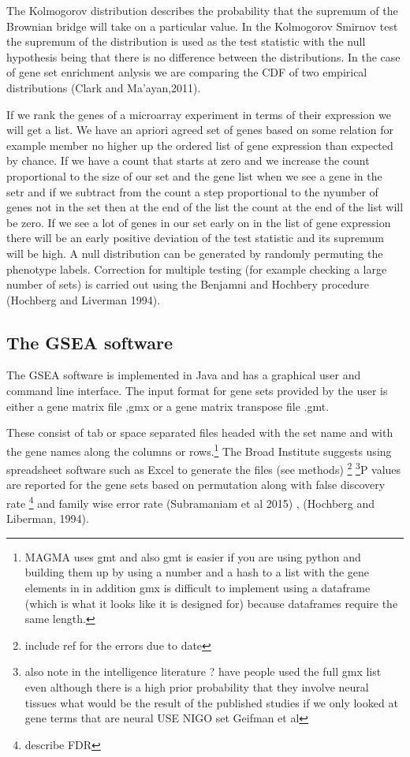 The Kolmogorov distribution describes the probability that the supremum of the Brownian bridge will take on a particular value. In the Kolmogorov Smirnov test the supremum of the distribution is used as the test statistic with the null hypothesis being that there is no difference between the distributions. In the case of gene set enrichment anlysis we are comparing the CDF of two empirical distributions (Clark and Ma'ayan,2011).

If we rank the genes of a microarray experiment in terms of their expression we will get a list. We have an apriori agreed set of genes based on some relation for example member no higher up the ordered list of gene expression than expected by chance. If we have a count that starts at zero and we increase the count proportional to the size of our set and the gene list when we see a gene in the setr and if we subtract from the count a step proportional to the nyumber of genes not in the set then at the end of the list the count at the end of the list will be zero. If we see a lot of genes in our set early on in the list of gene expression there will be an early positive deviation of the test statistic and its supremum will be high. A null distribution can be generated by randomly permuting the phenotype labels. Correction for multiple testing (for example checking a large number of sets) is carried out using the Benjamni and Hochbery procedure (Hochberg and Liverman 1994).

\subsection{The GSEA software}

The GSEA software is implemented in Java and has a graphical user and command line interface. The input format for gene sets provided by the user is either a gene matrix file ,gmx or a gene matrix transpose file .gmt.

These consist of tab or space separated files headed with the set name and with the gene names along the columns or rows.\footnote{MAGMA uses gmt and also gmt is easier if you are using python and building them up by using a number and a hash to a list with the gene elements in in addition gmx is difficult to implement using a dataframe (which is what it looks like it is designed for) because dataframes require the same length.} The Broad Institute suggests using spreadsheet software such as Excel to generate the files (see methods) \footnote{include ref for the errors due to date} \footnote{also note in the intelligence literature ? have people used the full gmx list even although there is a high prior probability that they involve neural tissues what would be the result of the published studies if we only looked at gene terms that are neural USE NIGO set   Geifman et al}P values are reported for the gene sets based on permutation along with false discovery rate \cite{benjamini1995controlling}\footnote{describe FDR} and family wise error rate (Subramaniam et al 2015) , (Hochberg and Liberman, 1994).

